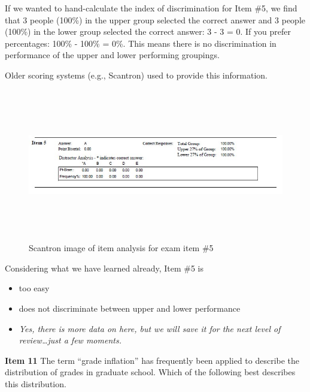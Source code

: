 \documentclass[
  english,
]{book}
\providecommand{\tightlist}{%
  \setlength{\itemsep}{0pt}\setlength{\parskip}{0pt}}
\begin{document}
If we wanted to hand-calculate the index of discrimination for Item \#5, we find that 3 people (100\%) in the upper group selected the correct answer and 3 people (100\%) in the lower group selected the correct answer: 3 - 3 = 0. If you prefer percentages: 100\% - 100\% = 0\%. This means there is no discrimination in performance of the upper and lower performing groupings.

Older scoring systems (e.g., Scantron) used to provide this information.

\begin{figure}
\hypertarget{id}{%
\centering
\includegraphics[width=10.41667in,height=2.60417in]{images/ItemAnalExam/Item5.jpg}
\caption{Scantron image of item analysis for exam item \#5}\label{id}
}
\end{figure}

Considering what we have learned already, Item \#5 is

\begin{itemize}
\tightlist
\item
  too easy
\item
  does not discriminate between upper and lower performance
\item
  \emph{Yes, there is more data on here, but we will save it for the next level of review\ldots just a few moments.}
\end{itemize}

\textbf{Item 11} The term ``grade inflation'' has frequently been applied to describe the distribution of grades in graduate school. Which of the following best describes this distribution.
\end{document}
